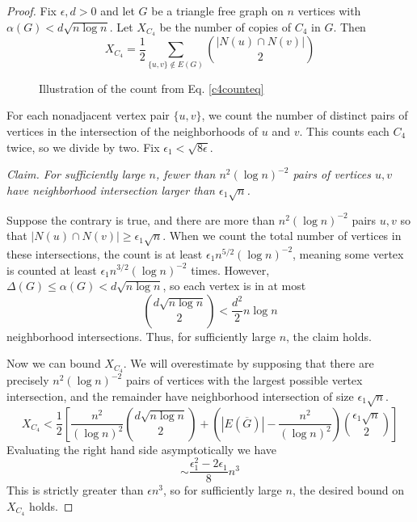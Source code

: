 \begin{proof}
Fix $\epsilon, d> 0$ and let $G$ be a triangle free graph on $n$ vertices with $\alpha(G) < d\sqrt{n\log n}$.  
%
Let $X_{C_4}$ be the number of copies of $C_4$ in $G$.  
%
Then
%
\begin{equation}
X_{C_4} = \frac{1}{2}\sum_{\{u,v\}\notin E(G)} {|N(u) \cap N(v)| \choose 2} 
\label{c4counteq}
\end{equation}
%
\begin{figure}
	\begin{center}
			
	\end{center}
	\label{c4count}
	\caption{Illustration of the count from Eq. \ref{c4counteq}}
\end{figure}
%
For each nonadjacent vertex pair $\{u,v\}$, we count the number of distinct pairs of vertices in the intersection of the neighborhoods of $u$ and $v$.  This counts each $C_4$ twice, so we divide by two. 
%
Fix $\epsilon_1 < \sqrt{8\epsilon}$.

\noindent\textit{Claim. For sufficiently large $n$, fewer than $n^2(\log n)^{-2}$ pairs of vertices $u,v$ have neighborhood intersection larger than $\epsilon_1\sqrt{n}$.}

Suppose the contrary is true, and there are more than $n^2(\log n)^{-2}$ pairs $u,v$ so that $|N(u)\cap N(v)| \geq \epsilon_1\sqrt{n}$.
%
When we count the total number of vertices in these intersections, the count is at least $\epsilon_1n^{5/2}(\log n)^{-2}$, meaning some vertex is counted at least $\epsilon_1n^{3/2}(\log n)^{-2}$ times.  However, $\Delta(G) \leq \alpha(G) < d\sqrt{n\log n}$, so each vertex is in at most \[{d\sqrt{n\log n}\choose 2 } < \frac{d^2}{2}n\log n\] neighborhood intersections.  Thus, for sufficiently large $n$,  the claim holds.

Now we can bound $X_{C_4}$.  We will overestimate by supposing that there are precisely $n^2(\log n)^{-2}$ pairs of vertices with the largest possible vertex intersection, and the remainder have neighborhood intersection of size $\epsilon_1\sqrt{n}$.
\begin{equation}X_{C_4} < \frac{1}{2}\left[\frac{n^2}{(\log n)^2}{d\sqrt{n\log n}\choose 2}+ \left(|E(\overline{G})|- \frac{n^2}{(\log n)^2}\right){\epsilon_1\sqrt{n}\choose 2}\right]
\end{equation}
Evaluating the right hand side asymptotically we have	
\begin{equation}
\sim \frac{\epsilon_1^2-2\epsilon_1}{8}n^3 
\end{equation}
This is strictly greater than $\epsilon n^3$, so for sufficiently large $n$, the desired bound on $X_{C_4}$ holds.
\end{proof}
 
